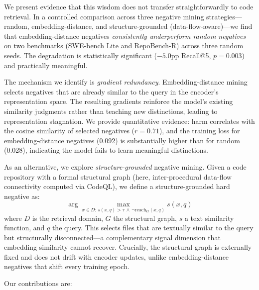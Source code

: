 \documentclass[11pt,a4paper]{article}
\begin{document}
We present evidence that this wisdom does not transfer straightforwardly to code retrieval.
In a controlled comparison across three negative mining strategies---random, embedding-distance, and structure-grounded (data-flow-aware)---we find that embedding-distance negatives \emph{consistently underperform random negatives} on two benchmarks (SWE-bench Lite and RepoBench-R) across three random seeds.
The degradation is statistically significant ($-5.0$pp Recall@5, $p{=}0.003$) and practically meaningful.

The mechanism we identify is \emph{gradient redundancy}.
Embedding-distance mining selects negatives that are already similar to the query in the encoder's representation space.
The resulting gradients reinforce the model's existing similarity judgments rather than teaching new distinctions, leading to representation stagnation.
We provide quantitative evidence: harm correlates with the cosine similarity of selected negatives ($r{=}0.71$), and the training loss for embedding-distance negatives (0.092) is substantially higher than for random (0.028), indicating the model fails to learn meaningful distinctions.

As an alternative, we explore \emph{structure-grounded} negative mining.
Given a code repository with a formal structural graph (here, inter-procedural data-flow connectivity computed via CodeQL), we define a structure-grounded hard negative as:
\begin{equation}
\arg\max_{x \in D:\, s(x,q) > \tau \,\wedge\, \neg\text{reach}_G(x,q)} s(x,q)
\label{eq:struct-neg}
\end{equation}
where $D$ is the retrieval domain, $G$ the structural graph, $s$ a text similarity function, and $q$ the query.
This selects files that are textually similar to the query but structurally disconnected---a complementary signal dimension that embedding similarity cannot recover.
Crucially, the structural graph is externally fixed and does not drift with encoder updates, unlike embedding-distance negatives that shift every training epoch.

Our contributions are:
\end{document}
